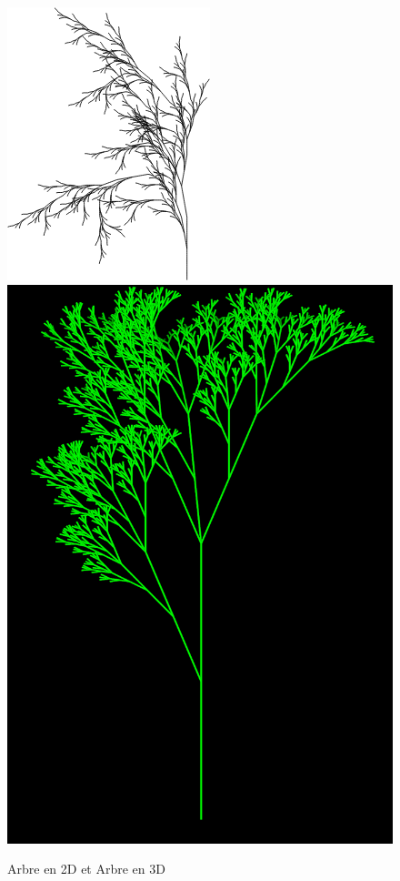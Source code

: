     \begin{figure}[h]
        \vspace{5.5em}
        \centering
        \includegraphics[scale=0.7]{images/tree-one.png}
        \hspace{5.5em}
        \includegraphics[scale=0.3]{images/tree-two.png}
        \caption{Arbre en 2D et Arbre en 3D}
        \label{fig:my_label}
    \end{figure}
    
	